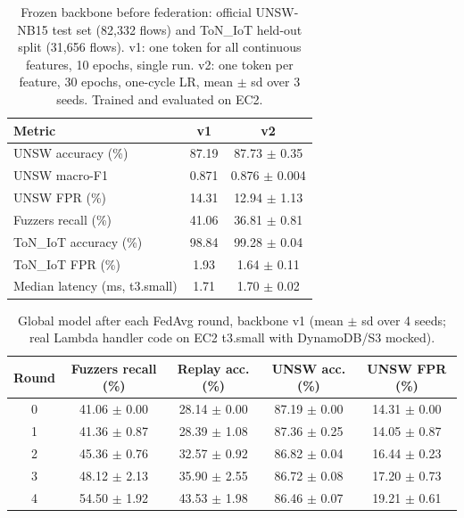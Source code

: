 \begin{table}[t]\centering
\caption{Frozen backbone before federation: official UNSW-NB15 test set (82{,}332 flows) and ToN\_IoT held-out split (31{,}656 flows). v1: one token for all continuous features, 10 epochs, single run. v2: one token per feature, 30 epochs, one-cycle LR, mean $\pm$ sd over 3 seeds. Trained and evaluated on EC2.}
\label{tab:backbone}
\begin{tabular}{lcc}\toprule
Metric & v1 & v2 \\ \midrule
UNSW accuracy (\%) & 87.19 & 87.73 $\pm$ 0.35 \\
UNSW macro-F1 & 0.871 & 0.876 $\pm$ 0.004 \\
UNSW FPR (\%) & 14.31 & 12.94 $\pm$ 1.13 \\
Fuzzers recall (\%) & 41.06 & 36.81 $\pm$ 0.81 \\
ToN\_IoT accuracy (\%) & 98.84 & 99.28 $\pm$ 0.04 \\
ToN\_IoT FPR (\%) & 1.93 & 1.64 $\pm$ 0.11 \\
Median latency (ms, t3.small) & 1.71 & 1.70 $\pm$ 0.02 \\
\bottomrule\end{tabular}\end{table}

\begin{table}[t]\centering
\caption{Global model after each FedAvg round, backbone v1 (mean $\pm$ sd over 4 seeds; real Lambda handler code on EC2 t3.small with DynamoDB/S3 mocked).}
\label{tab:fed_rounds_v1}
\begin{tabular}{ccccc}\toprule
Round & Fuzzers recall (\%) & Replay acc. (\%) & UNSW acc. (\%) & UNSW FPR (\%) \\ \midrule
0 & 41.06 $\pm$ 0.00 & 28.14 $\pm$ 0.00 & 87.19 $\pm$ 0.00 & 14.31 $\pm$ 0.00 \\
1 & 41.36 $\pm$ 0.87 & 28.39 $\pm$ 1.08 & 87.36 $\pm$ 0.25 & 14.05 $\pm$ 0.87 \\
2 & 45.36 $\pm$ 0.76 & 32.57 $\pm$ 0.92 & 86.82 $\pm$ 0.04 & 16.44 $\pm$ 0.23 \\
3 & 48.12 $\pm$ 2.13 & 35.90 $\pm$ 2.55 & 86.72 $\pm$ 0.08 & 17.20 $\pm$ 0.73 \\
4 & 54.50 $\pm$ 1.92 & 43.53 $\pm$ 1.98 & 86.46 $\pm$ 0.07 & 19.21 $\pm$ 0.61 \\
\bottomrule\end{tabular}\end{table}

